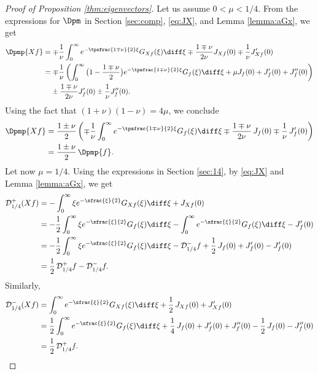 \begin{proof}[{Proof of Proposition \ref{thm:eigenvectors}}]
Let us assume $0<\mu< 1/4$. From the expressions for $\Dpm$ in Section \ref{sec:comp}, \eqref{eq:JX}, and Lemma \ref{lemma:aGx}, we get
\begin{equation*}
\begin{split}
\Dpmp{Xf} &= \mp \frac{1}{\nu} \int_0^\infty e^{-\tpsfrac{1 \mp \nu}{2}\xi} G_{Xf}(\xi) \diff \xi \mp \frac{1 \mp \nu}{2\nu} J_{Xf}(0) \mp \frac{1}{\nu} J'_{Xf}(0)\\
&= \mp \frac{1}{\nu} \left(\int_0^\infty \big(1 -\frac{1 \mp \nu}{2}\big) e^{-\tpsfrac{1 \mp \nu}{2}\xi} G_f(\xi) \diff \xi + \mu J_f(0) + J_f'(0) + J_f''(0) \right) \\
&\hphantom{{}=} \pm \frac{1 \mp \nu}{2\nu} J'_f(0) \pm \frac{1}{\nu} J''_f(0).
\end{split}
\end{equation*}
Using the fact that $(1+\nu)(1-\nu) = 4 \mu$, we conclude
\begin{align*}
\Dpmp{Xf} &= \frac{1 \pm \nu}{2} \left(\mp \frac{1}{\nu} \int_0^\infty e^{-\tpsfrac{1 \mp \nu}{2}\xi} G_f(\xi) \diff \xi \mp \frac{1 \mp \nu}{2\nu} \,J_f(0) \mp \frac{1}{\nu}\, J_f'(0) \right)\\
& = \frac{1 \pm \nu}{2}\, \Dpmp{f}.
\end{align*}
Let now $\mu = 1/4$. Using the expressions in Section \ref{sec:14}, by \eqref{eq:JX} and Lemma \ref{lemma:aGx}, we get
\begin{align*}
\mathcal{D}_{1/4}^{+}(Xf) &= - \int_0^\infty \xi e^{-\sfrac{\xi}{2}} G_{Xf}(\xi) \diff \xi + J_{Xf}(0)\\
&=- \frac{1}{2} \int_0^\infty \xi e^{-\sfrac{\xi}{2}} G_{f}(\xi) \diff \xi -\int_0^\infty e^{-\sfrac{\xi}{2}} G_{f}(\xi) \diff \xi -J_f'(0) \\
&=- \frac{1}{2} \int_0^\infty \xi e^{-\sfrac{\xi}{2}} G_{f}(\xi) \diff \xi -\mathcal{D}_{1/4}^{-}f +\frac{1}{2}\,J_f(0) + J_f'(0) -J_f'(0)\\
& = \frac{1}{2}\, \mathcal{D}_{1/4}^{+}f - \mathcal{D}_{1/4}^{-}f .
\end{align*}
Similarly,
\begin{align*}
\mathcal{D}_{1/4}^{-}(Xf) &= \int_0^\infty e^{-\sfrac{\xi}{2}} G_{Xf}(\xi) \diff \xi + \frac{1}{2}\, J_{Xf}(0) + J_{Xf}'(0)\\
&=\frac{1}{2}\int_0^\infty e^{-\sfrac{\xi}{2}} G_{f}(\xi) \diff \xi + \frac{1}{4}\, J_f(0) + J'_f(0) + J_f''(0) - \frac{1}{2}\,J_{f}(0) - J_{f}''(0)\\
& = \frac{1}{2}\, \mathcal{D}_{1/4}^{+}f.
\end{align*}


\end{proof}

